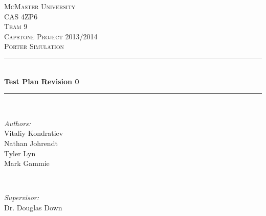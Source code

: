 \documentclass[paper=letter, fontsize=10pt]{scrartcl}
\numberwithin{equation}{section}		%
\numberwithin{figure}{section}			%
\numberwithin{table}{section}				%
\begin{document}
\begin{titlepage}

\newcommand{\HRule}{\rule{\linewidth}{0.5mm}} %
\newcommand{\authors}{\shortstack{Vitaliy Kondratiev,\\Nathan Johrendt,\\Tyler Lyn,\\Mark Gammie}}

\begin{center}
 

\textsc{\LARGE McMaster University}\\[1.5cm] %
\textsc{\Large CAS 4ZP6}\\[0.5cm]
\textsc{\Large Team 9} \\[0.5cm]
\textsc{\Large Capstone Project 2013/2014}\\[0.5cm] %
\textsc{\large Porter Simulation}\\[0.5cm] %


\HRule \\[0.4cm]
{ \huge \bfseries Test Plan Revision 0}\\[0.4cm] %
\HRule \\[1.5cm]
 

\begin{minipage}{0.4\textwidth}
\begin{flushleft} \large
\emph{Authors:}\\
Vitaliy Kondratiev\\
Nathan Johrendt\\
Tyler Lyn\\
Mark Gammie
\end{flushleft}
\end{minipage}
~
\begin{minipage}{0.4\textwidth}
\begin{flushright} \large
\emph{Supervisor:} \\
Dr. Douglas Down %
\end{flushright}
\end{minipage}\\[4cm]


\end{center}
\end{titlepage}
\end{document}
